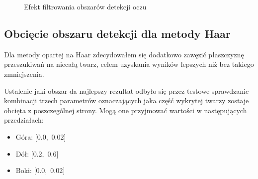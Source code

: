 \begin{figure}[!h]
    \begin{center}
        \hspace{8mm}
    \end{center}
    \caption{Efekt filtrowania obszarów detekcji oczu}
    \label{fig:eye_filter}
\end{figure}

\subsection{Obcięcie obszaru detekcji dla metody Haar}

Dla metody opartej na Haar zdecydowałem się dodatkowo zawęzić płaszczyznę przeszukiwań na niecałą twarz, celem uzyskania wyników lepszych niż bez takiego zmniejszenia. 
\par
Ustalenie jaki obszar da najlepszy rezultat odbyło się przez testowe sprawdzanie kombinacji trzech parametrów oznaczających jaka część wykrytej twarzy zostaje obcięta z poszczególnej strony. Mogą one przyjmować wartości w następujących przedziałach:

\begin{itemize}
    \item Góra: $[0.0,$ $0.02]$
    \item Dół: $[0.2,$ $0.6]$
    \item Boki: $[0.0,$ $0.02]$
\end{itemize}

